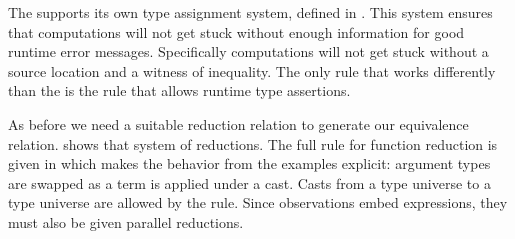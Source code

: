The \clang{} supports its own type assignment system, defined in .
This system ensures that computations will not get stuck without enough information for good runtime error messages.
Specifically computations will not get stuck without a source location and a witness of inequality.
The only rule that works differently than the \slang{} is the  rule that allows runtime type assertions.
 
As before we need a suitable reduction relation to generate our equivalence relation.
 shows that system of reductions.
The full rule for function reduction is given in  which makes the behavior from the examples explicit: argument types are swapped as a term is applied under a cast.
Casts from a type universe to a type universe are allowed by the  rule.
Since observations embed expressions, they must also be given parallel reductions.
 
